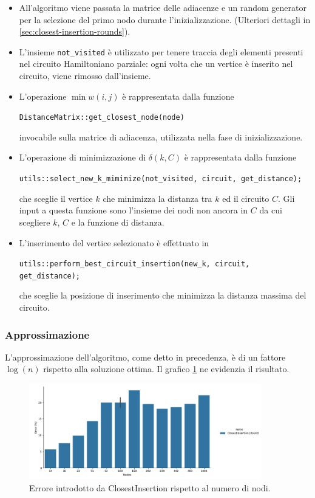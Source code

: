 \begin{itemize}
    \item All'algoritmo viene passata la matrice delle adiacenze e un
      random generator per la selezione del primo nodo durante
      l'inizializzazione. (Ulteriori dettagli in
      \ref{sec:closest-insertion-rounds}).

    \item L'insieme \texttt{not_visited} è utilizzato per
      tenere traccia degli elementi presenti nel circuito Hamiltoniano
      parziale: ogni volta che un vertice è inserito nel circuito,
      viene rimosso dall'insieme.

    \item L'operazione $\min w(i, j)$ è rappresentata dalla funzione
    \begin{center}
        \texttt{DistanceMatrix::get_closest_node(node)}
    \end{center}
    invocabile sulla matrice di adiacenza, utilizzata nella fase di
    inizializzazione.

    \item L'operazione di minimizzazione di $\delta(k, C)$ è
      rappresentata dalla funzione
    \begin{center}
        \texttt{utils::select_new_k_mimimize(not_visited, circuit, get_distance);}
    \end{center}
    che sceglie il vertice $k$ che minimizza la distanza tra $k$ 
    ed il circuito $C$. Gli input a questa funzione sono l'insieme 
    dei nodi non ancora in $C$ da cui scegliere $k$, $C$ e la 
    funzione di distanza.

    \item L'inserimento del vertice selezionato è effettuato in
    \begin{center}
        \texttt{utils::perform_best_circuit_insertion(new_k, circuit, get_distance);}
    \end{center}
    che sceglie la posizione di inserimento che minimizza la distanza
    massima del circuito.
\end{itemize}

\subsubsection{Approssimazione}

L'approssimazione dell'algoritmo, come detto in precedenza, è di un
fattore $\log(n)$ rispetto alla soluzione ottima. Il grafico
\ref{fig:closest-insertion-1-round-accuracy-error} ne evidenzia il
risultato.

\begin{figure}[!ht]
    \centering

    \includegraphics[width=0.9\textwidth]{./images/ClosestInsertion1Round__approximation_error_.png}

    \caption{Errore introdotto da ClosestInsertion rispetto al numero di nodi.}
    \label{fig:closest-insertion-1-round-accuracy-error}
\end{figure}
